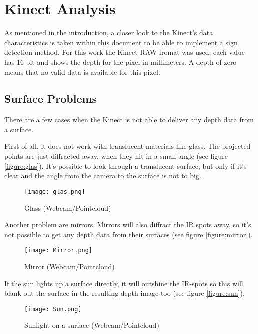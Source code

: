 \chapter{Kinect Analysis}
\graphicspath{{./KinectData/img/}}

As mentioned in the introduction, a closer look to the Kinect's data characteristics is taken
within this document to be able to implement a sign detection method. 
For this work the Kinect RAW fromat was used, each value has 16 bit and shows the
depth for the pixel in millimeters. A depth of zero means that no valid data is available for
this pixel.

\section{Surface Problems}
There are a few cases when the Kinect is not able to deliver any depth data from a surface.

First of all, it does not work with translucent materials like glass. The projected
points are just diffracted away, when they hit in a small angle (see figure \vref{figure:glas}). 
It's possible to look through a translucent surface, but only if it's clear and the angle from the 
camera to the surface is not to big.
\begin{figure}[htp]
\begin{center}
  \texttt{[image: glas.png]} 
  \caption{Glass (Webcam/Pointcloud)}
  \label{figure:glas}
\end{center}
\end{figure}
 
Another problem are mirrors. Mirrors will also diffract the IR spots away, 
so it's not possible to get any depth data from their surfaces (see figure \vref{figure:mirror}).
\begin{figure}[htp]
\begin{center}
  \texttt{[image: Mirror.png]}
  \caption{Mirror (Webcam/Pointcloud)}
  \label{figure:mirror}
\end{center}
\end{figure}

If the sun lights up a surface directly, it will outshine the IR-spots so this will blank out the surface
in the resulting depth image too (see figure \vref{figure:sun}).
\begin{figure}[htp]
\begin{center}
  \texttt{[image: Sun.png]}
  \caption{Sunlight on a surface (Webcam/Pointcloud)}
  \label{figure:sun}
\end{center}
\end{figure}

